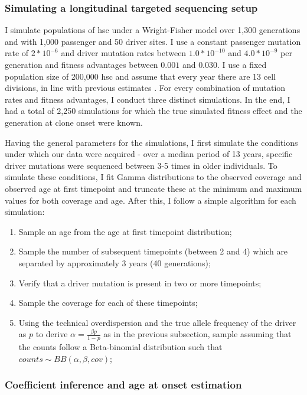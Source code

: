 \subsubsection{Simulating a longitudinal targeted sequencing setup}

I simulate populations of \ac{hsc} under a Wright-Fisher model \cite{Beerenwinkel_undated-up} over 1,300 generations and with 1,000 passenger and 50 driver sites. I use a constant passenger mutation rate of $2*10^{-6}$ and driver mutation rates between $1.0*10^{-10}$ and $4.0*10^{-9}$ per generation and fitness advantages between $0.001$ and $0.030$. I use a fixed population size of 200,000 \ac{hsc} and assume that every year there are 13 cell divisions, in line with previous estimates \cite{Lee-Six2018-lp,Watson2020-pz}. For every combination of mutation rates and fitness advantages, I conduct three distinct simulations. In the end, I had a total of 2,250 simulations for which the true simulated fitness effect and the generation at clone onset were known.

Having the general parameters for the simulations, I first simulate the conditions under which our data were acquired - over a median period of 13 years, specific driver mutations were sequenced between 3-5 times in older individuals. To simulate these conditions, I fit Gamma distributions to the observed coverage and observed age at first timepoint and truncate these at the minimum and maximum values for both coverage and age. After this, I follow a simple algorithm for each simulation:

\begin{enumerate}
    \item Sample an age from the age at first timepoint distribution;
    \item Sample the number of subsequent timepoints (between 2 and 4) which are separated by approximately 3 years (40 generations);
    \item Verify that a driver mutation is present in two or more timepoints;
    \item Sample the coverage for each of these timepoints;
    \item Using the technical overdispersion and the true allele frequency of the driver as $p$ to derive $\alpha = \frac{\beta p}{1-p}$ as in the previous subsection, sample assuming that the counts follow a Beta-binomial distribution such that $counts \sim BB(\alpha,\beta,cov)$;
\end{enumerate}

\subsubsection{Coefficient inference and age at onset estimation}

